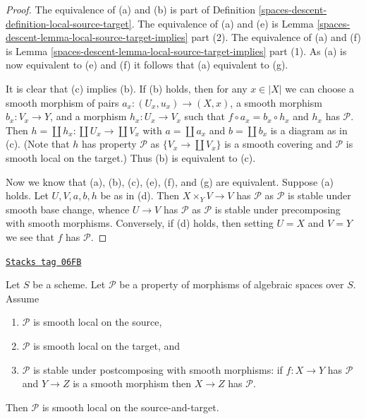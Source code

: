 \begin{proof}
The equivalence of (a) and (b) is part of
Definition \ref{spaces-descent-definition-local-source-target}.
The equivalence of (a) and (e) is
Lemma \ref{spaces-descent-lemma-local-source-target-implies} part (2).
The equivalence of (a) and (f) is
Lemma \ref{spaces-descent-lemma-local-source-target-implies} part (1).
As (a) is now equivalent to (e) and (f) it follows that
(a) equivalent to (g).

\medskip\noindent
It is clear that (c) implies (b). If (b) holds, then for any
$x \in |X|$ we can choose a smooth morphism of pairs
$a_x : (U_x, u_x) \to (X, x)$, a smooth morphism $b_x : V_x \to Y$, and
a morphism $h_x : U_x \to V_x$ such that $f \circ a_x = b_x \circ h_x$ and
$h_x$ has $\mathcal{P}$. Then $h = \coprod h_x : \coprod U_x \to \coprod V_x$
with $a = \coprod a_x$ and $b = \coprod b_x$ is a diagram as in (c).
(Note that $h$ has property $\mathcal{P}$ as $\{V_x \to \coprod V_x\}$
is a smooth covering and $\mathcal{P}$ is smooth local on the target.)
Thus (b) is equivalent to (c).

\medskip\noindent
Now we know that (a), (b), (c), (e), (f), and (g) are equivalent.
Suppose (a) holds. Let $U, V, a, b, h$ be as in (d). Then
$X \times_Y V \to V$ has $\mathcal{P}$ as $\mathcal{P}$ is stable under
smooth base change, whence $U \to V$ has $\mathcal{P}$ as $\mathcal{P}$
is stable under precomposing with smooth morphisms. Conversely, if (d)
holds, then setting $U = X$ and $V = Y$ we see that $f$ has $\mathcal{P}$.
\end{proof}

\begin{lemma}
\label{spaces-descent-lemma-smooth-local-source-target}
\href{https://stacks.math.columbia.edu/tag/06FB}{\texttt{Stacks tag 06FB}}

Let $S$ be a scheme.
Let $\mathcal{P}$ be a property of morphisms of algebraic spaces over $S$.
Assume
\begin{enumerate}
\item $\mathcal{P}$ is smooth local on the source,
\item $\mathcal{P}$ is smooth local on the target, and
\item $\mathcal{P}$ is stable under postcomposing with smooth morphisms:
if $f : X \to Y$ has $\mathcal{P}$ and $Y \to Z$ is a smooth morphism
then $X \to Z$ has $\mathcal{P}$.
\end{enumerate}
Then $\mathcal{P}$ is smooth local on the source-and-target.
\end{lemma}

